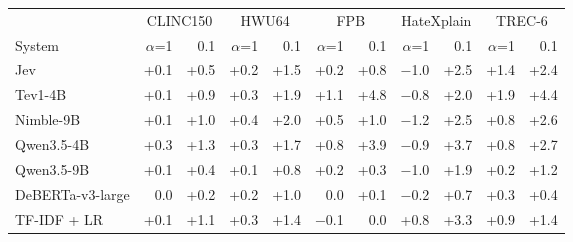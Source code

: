 \begin{tabular}{lrrrrrrrrrr}
\toprule
 & \multicolumn{2}{c}{CLINC150} & \multicolumn{2}{c}{HWU64} & \multicolumn{2}{c}{FPB} & \multicolumn{2}{c}{HateXplain} & \multicolumn{2}{c}{TREC-6} \\
\cmidrule(lr){2-3} \cmidrule(lr){4-5} \cmidrule(lr){6-7} \cmidrule(lr){8-9} \cmidrule(lr){10-11}
System & $\alpha$=1 & 0.1 & $\alpha$=1 & 0.1 & $\alpha$=1 & 0.1 & $\alpha$=1 & 0.1 & $\alpha$=1 & 0.1 \\
\midrule
Jev & +0.1 & +0.5 & +0.2 & +1.5 & +0.2 & +0.8 & $-$1.0 & +2.5 & +1.4 & +2.4 \\
Tev1-4B & +0.1 & +0.9 & +0.3 & +1.9 & +1.1 & +4.8 & $-$0.8 & +2.0 & +1.9 & +4.4 \\
Nimble-9B & +0.1 & +1.0 & +0.4 & +2.0 & +0.5 & +1.0 & $-$1.2 & +2.5 & +0.8 & +2.6 \\
Qwen3.5-4B & +0.3 & +1.3 & +0.3 & +1.7 & +0.8 & +3.9 & $-$0.9 & +3.7 & +0.8 & +2.7 \\
Qwen3.5-9B & +0.1 & +0.4 & +0.1 & +0.8 & +0.2 & +0.3 & $-$1.0 & +1.9 & +0.2 & +1.2 \\
DeBERTa-v3-large & 0.0 & +0.2 & +0.2 & +1.0 & 0.0 & +0.1 & $-$0.2 & +0.7 & +0.3 & +0.4 \\
TF-IDF + LR & +0.1 & +1.1 & +0.3 & +1.4 & $-$0.1 & 0.0 & +0.8 & +3.3 & +0.9 & +1.4 \\
\bottomrule
\end{tabular}
